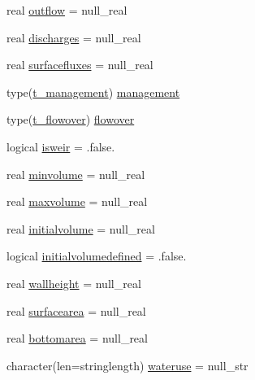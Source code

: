 \begin{DoxyCompactItemize}
\item 
real \mbox{\hyperlink{structmodulereservoirs_1_1t__reservoir_aa4a40ca6ad96ca268e06216338ebf42d}{outflow}} = null\+\_\+real
\item 
real \mbox{\hyperlink{structmodulereservoirs_1_1t__reservoir_ad6aca8588ecad64dd5ea326b7406776b}{discharges}} = null\+\_\+real
\item 
real \mbox{\hyperlink{structmodulereservoirs_1_1t__reservoir_a369faf52947b17016bccb25e31f9d4cd}{surfacefluxes}} = null\+\_\+real
\item 
type(\mbox{\hyperlink{structmodulereservoirs_1_1t__management}{t\+\_\+management}}) \mbox{\hyperlink{structmodulereservoirs_1_1t__reservoir_a42609200186bf77a559abd69977986b4}{management}}
\item 
type(\mbox{\hyperlink{structmodulereservoirs_1_1t__flowover}{t\+\_\+flowover}}) \mbox{\hyperlink{structmodulereservoirs_1_1t__reservoir_ae6b23abc10aa0677664c346e67089e9e}{flowover}}
\item 
logical \mbox{\hyperlink{structmodulereservoirs_1_1t__reservoir_afc910932a1c0fe86627d2a70cd9eadcb}{isweir}} = .false.
\item 
real \mbox{\hyperlink{structmodulereservoirs_1_1t__reservoir_a5944d7e65baa5117348fc65f0fab3e18}{minvolume}} = null\+\_\+real
\item 
real \mbox{\hyperlink{structmodulereservoirs_1_1t__reservoir_a42c4398fd0c9c8b961ace51f25b41d16}{maxvolume}} = null\+\_\+real
\item 
real \mbox{\hyperlink{structmodulereservoirs_1_1t__reservoir_a62b9478325f97113f619330954e7acc3}{initialvolume}} = null\+\_\+real
\item 
logical \mbox{\hyperlink{structmodulereservoirs_1_1t__reservoir_af1acecfc0d0300f73b25c9fa1027aaa2}{initialvolumedefined}} = .false.
\item 
real \mbox{\hyperlink{structmodulereservoirs_1_1t__reservoir_a53a79d4766f0b625c18a402b9bbb83e0}{wallheight}} = null\+\_\+real
\item 
real \mbox{\hyperlink{structmodulereservoirs_1_1t__reservoir_a1da749929f530c04209e76e426aedf9d}{surfacearea}} = null\+\_\+real
\item 
real \mbox{\hyperlink{structmodulereservoirs_1_1t__reservoir_a8617108d0b03a6d1637ff526752ea07b}{bottomarea}} = null\+\_\+real
\item 
character(len=stringlength) \mbox{\hyperlink{structmodulereservoirs_1_1t__reservoir_a87a1e099a23dffefb04b20c853aee510}{wateruse}} = null\+\_\+str
\item 

\end{DoxyCompactItemize}
